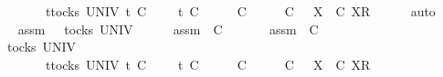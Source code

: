 \begin{isabellebody}
\ \ \ \ \ \ \ \ \ {\isacharparenleft}{\isasymexists}{\isasymsigma}{\isacharprime}{\isachardot}\ {\isacharparenleft}{\isasymforall}t{\isasymin}tocks\ UNIV{\isachardot}\ t\ {\isasymle}\isactrlsub C\ {\isasymrho}{\isacharprime}\ {\isacharat}\ {\isasymsigma}{\isacharprime}\ {\isasymlongrightarrow}\ t\ {\isasymle}\isactrlsub C\ {\isasymrho}{\isacharprime}{\isacharparenright}\ {\isasymand}\ {\isasymrho}{\isacharprime}\ {\isacharat}\ {\isasymsigma}{\isacharprime}\ {\isasymlesssim}\isactrlsub C\ {\isasymrho}\ {\isacharat}\ {\isasymsigma}\ {\isasymand}\ {\isacharparenleft}{\isasymsigma}{\isacharprime}\ {\isasymlesssim}\isactrlsub C\ {\isasymsigma}\ {\isasymor}\ {\isacharparenleft}{\isasymexists}X{\isachardot}\ {\isasymsigma}{\isacharprime}\ {\isasymlesssim}\isactrlsub C\ {\isacharbrackleft}X{\isacharbrackright}\isactrlsub R\ {\isacharhash}\ {\isasymsigma}{\isacharparenright}{\isacharparenright}{\isacharparenright}{\isachardoublequoteclose}\isanewline
\ \ \isamarkupfalse%
\ {\isacharparenleft}auto{\isacharparenright}\isanewline
\ \ \ \ \isamarkupfalse%
\ assm{}{\isacharcolon}\ {\isachardoublequoteopen}{\isasymrho}{\isacharprime}\ {\isasymin}\ tocks\ UNIV{\isachardoublequoteclose}\isanewline
\ \ \ \ \isamarkupfalse%
\ assm{}{\isacharcolon}\ {\isachardoublequoteopen}{\isasymsigma}{\isacharprime}\ {\isasymlesssim}\isactrlsub C\ {\isasymsigma}{\isachardoublequoteclose}\isanewline
\ \ \ \ \isamarkupfalse%
\ assm{}{\isacharcolon}\ {\isachardoublequoteopen}{\isasymrho}{\isacharprime}\ {\isasymlesssim}\isactrlsub C\ {\isasymrho}{\isachardoublequoteclose}\isanewline
\ \ \ \ \isamarkupfalse%
\ {\isachardoublequoteopen}{\isasymexists}{\isasymrho}{\isacharprime}{\isachardot}\ {\isasymrho}{\isacharprime}\ {\isasymin}\ tocks\ UNIV\ {\isasymand}\isanewline
\ \ \ \ \ \ \ \ \ {\isacharparenleft}{\isasymexists}{\isasymsigma}{\isacharprime}{\isachardot}\ {\isacharparenleft}{\isasymforall}t{\isasymin}tocks\ UNIV{\isachardot}\ t\ {\isasymle}\isactrlsub C\ {\isasymrho}{\isacharprime}\ {\isacharat}\ {\isasymsigma}{\isacharprime}\ {\isasymlongrightarrow}\ t\ {\isasymle}\isactrlsub C\ {\isasymrho}{\isacharprime}{\isacharparenright}\ {\isasymand}\ {\isasymrho}{\isacharprime}\ {\isacharat}\ {\isasymsigma}{\isacharprime}\ {\isasymlesssim}\isactrlsub C\ {\isasymrho}\ {\isacharat}\ {\isasymsigma}\ {\isasymand}\ {\isacharparenleft}{\isasymsigma}{\isacharprime}\ {\isasymlesssim}\isactrlsub C\ {\isasymsigma}\ {\isasymor}\ {\isacharparenleft}{\isasymexists}X{\isachardot}\ {\isasymsigma}{\isacharprime}\ {\isasymlesssim}\isactrlsub C\ {\isacharbrackleft}X{\isacharbrackright}\isactrlsub R\ {\isacharhash}\ {\isasymsigma}{\isacharparenright}{\isacharparenright}{\isacharparenright}{\isachardoublequoteclose}\isanewline

\end{isabellebody}
